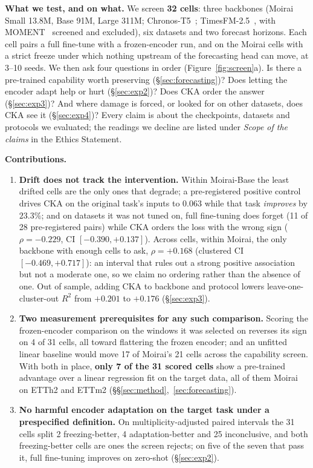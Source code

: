\textbf{What we test, and on what.}  We screen \textbf{32 cells}: three backbones
(Moirai Small 13.8M, Base 91M, Large 311M; Chronos-T5~\citep{ansari2024chronos};
TimesFM-2.5~\citep{das2024timeseries}, with MOMENT~\citep{goswami2024moment}
screened and excluded), six datasets and two forecast horizons.  Each cell pairs
a full fine-tune with a frozen-encoder run, and on the Moirai cells with a strict
freeze under which nothing upstream of the forecasting head can move, at 3--10
seeds.  We then ask four questions in order (Figure~\ref{fig:screen}a).  Is
there a pre-trained capability worth preserving (\S\ref{sec:forecasting})?  Does
letting the encoder adapt help or hurt (\S\ref{sec:exp2})?  Does CKA order the
answer (\S\ref{sec:exp3})?  And where damage is forced, or looked for on other
datasets, does CKA see it (\S\ref{sec:exp4})?  Every claim is about the
checkpoints, datasets and protocols we evaluated; the readings we decline are
listed under \emph{Scope of the claims} in the Ethics Statement.

\textbf{Contributions.}
\begin{enumerate}\itemsep1pt
  \item \textbf{Drift does not track the intervention.}  Within Moirai-Base the
    least drifted cells are the only ones that degrade; a pre-registered positive
    control drives CKA on the original task's inputs to $0.063$ while that task
    \emph{improves} by $23.3\%$; and on datasets it was not tuned on, full
    fine-tuning does forget (11 of 28 pre-registered pairs) while CKA orders the
    loss with the wrong sign ($\rho{=}{-}0.229$, CI $[-0.390,{+}0.137]$).
    Across cells, within Moirai, the only backbone with enough cells to ask,
    $\rho{=}{+}0.168$ (clustered CI $[-0.469,{+}0.717]$): an interval that rules out
    a strong positive association but not a moderate one, so we claim no ordering
    rather than the absence of one.  Out of sample, adding CKA to backbone and
    protocol lowers leave-one-cluster-out $R^2$ from $+0.201$ to $+0.176$
    (\S\ref{sec:exp3}).
  \item \textbf{Two measurement prerequisites for any such comparison.}  Scoring
    the frozen-encoder comparison on the windows it was selected on reverses its
    sign on 4 of 31 cells, all toward flattering the frozen encoder; and an unfitted
    linear baseline would move 17 of Moirai's 21 cells across the capability screen.
    With both in place, \textbf{only 7 of the 31 scored cells} show a pre-trained
    advantage over a linear regression fit on the target data, all of them Moirai
    on ETTh2 and ETTm2 (\S\S\ref{sec:method},~\ref{sec:forecasting}).
  \item \textbf{No harmful encoder adaptation on the target task under a prespecified definition.}
    On multiplicity-adjusted paired intervals the 31 cells split 2 freezing-better,
    4 adaptation-better and 25 inconclusive, and both freezing-better cells are
    ones the screen rejects; on five of the seven that pass it, full fine-tuning
    improves on zero-shot (\S\ref{sec:exp2}).
\end{enumerate}
